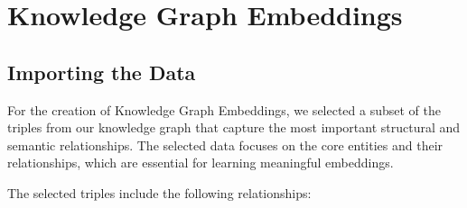 \documentclass[10pt,a4paper]{article}
\begin{document}
\section{Knowledge Graph Embeddings}

\subsection{Importing the Data}

For the creation of Knowledge Graph Embeddings, we selected a subset of the triples from our knowledge graph that capture the most important structural and semantic relationships. The selected data focuses on the core entities and their relationships, which are essential for learning meaningful embeddings.

The selected triples include the following relationships:
\end{document}
